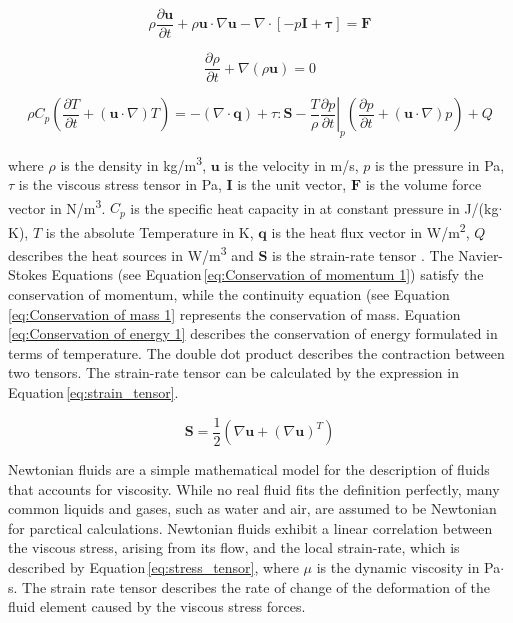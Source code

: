 \begin{equation}
\rho\frac{\partial \boldsymbol u}{\partial t} + \rho\boldsymbol u\cdotp\nabla\boldsymbol u - \nabla\cdotp[-p\boldsymbol I + \boldsymbol \tau] = \boldsymbol F
\label{eq:Conservation of momentum 1}
\end{equation}


\begin{equation}
\frac{\partial\rho}{\partial t}+\nabla(\rho\boldsymbol u) = 0
\label{eq:Conservation of mass 1}
\end{equation}

\begin{equation}
\rho C_{p}\left(\frac{\partial T}{\partial t}+(\boldsymbol u \cdotp\nabla)T\right) = -(\nabla\cdotp\boldsymbol q)+\tau:\boldsymbol S -\frac{T}{\rho}\left.\frac{\partial p}{\partial t}\right\vert_{p}\left(\frac{\partial p}{\partial t}+(\boldsymbol u\cdotp\nabla)p\right)+Q 
\label{eq:Conservation of energy 1}
\end{equation}

where $\rho$ is the density in kg/m\textsuperscript{3}, $\boldsymbol u$ is the velocity in m/s, $p$ is the pressure in Pa, $\tau$ is the viscous stress tensor in Pa, $\boldsymbol I$ is the unit vector, $\boldsymbol F$ is the volume force vector in N/m\textsuperscript{3}. $C_{p}$ is the specific heat capacity in at constant pressure in J/(kg$\cdotp$K), $T$ is the absolute Temperature in K, $\boldsymbol q$ is the heat flux vector in W/m\textsuperscript{2}, $Q$ describes the heat sources in W/m\textsuperscript{3} and $\boldsymbol S$ is the strain-rate tensor \cite{ComsolRefManual}. The Navier-Stokes Equations (see Equation\,\ref{eq:Conservation of momentum 1}) satisfy the conservation of momentum, while the continuity equation (see Equation\,\ref{eq:Conservation of mass 1} represents the conservation of mass. Equation\,\ref{eq:Conservation of energy 1} describes the conservation of energy formulated in terms of temperature. The double dot product describes the contraction between two tensors. The strain-rate tensor can be calculated by the expression in Equation\,\ref{eq:strain_tensor}\cite{ComsolRefManual}.

\begin{equation}
\boldsymbol S = \frac{1}{2}(\nabla\boldsymbol u+(\nabla\boldsymbol u)^{T})
\label{eq:strain_tensor}
\end{equation}

Newtonian fluids are a simple mathematical model for the description of fluids that accounts for viscosity. While no real fluid fits the definition perfectly, many common liquids and gases, such as water and air, are assumed to be Newtonian for parctical calculations. Newtonian fluids exhibit a linear correlation between the viscous stress, arising from its flow, and the local strain-rate, which is described by Equation\,\ref{eq:stress_tensor}, where $\mu$ is the dynamic viscosity in Pa$\cdotp$s. The strain rate tensor describes the rate of change of the deformation of the fluid element caused by the viscous stress forces.

